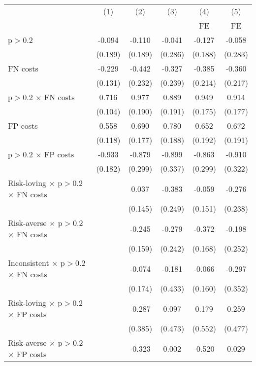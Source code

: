 \begin{tabular}{l*{5}{c}}
\hline\hline
                &\multicolumn{1}{c}{(1)}&\multicolumn{1}{c}{(2)}&\multicolumn{1}{c}{(3)}&\multicolumn{1}{c}{(4)}&\multicolumn{1}{c}{(5)}\\
                &\multicolumn{1}{c}{}&\multicolumn{1}{c}{}&\multicolumn{1}{c}{}&\multicolumn{1}{c}{FE}&\multicolumn{1}{c}{FE}\\
\hline
p$>$0.2         &   -0.094&   -0.110&   -0.041&   -0.127&   -0.058\\
                &  (0.189)&  (0.189)&  (0.286)&  (0.188)&  (0.283)\\
FN costs        &   -0.229&   -0.442&   -0.327&   -0.385&   -0.360\\
                &  (0.131)&  (0.232)&  (0.239)&  (0.214)&  (0.217)\\
p$>$0.2 $\times$ FN costs&    0.716&    0.977&    0.889&    0.949&    0.914\\
                &  (0.104)&  (0.190)&  (0.191)&  (0.175)&  (0.177)\\
FP costs        &    0.558&    0.690&    0.780&    0.652&    0.672\\
                &  (0.118)&  (0.177)&  (0.188)&  (0.192)&  (0.191)\\
p$>$0.2 $\times$ FP costs&   -0.933&   -0.879&   -0.899&   -0.863&   -0.910\\
                &  (0.182)&  (0.299)&  (0.337)&  (0.299)&  (0.322)\\
Risk-loving $\times$ p$>$0.2 $\times$ FN costs&         &    0.037&   -0.383&   -0.059&   -0.276\\
                &         &  (0.145)&  (0.249)&  (0.151)&  (0.238)\\
Risk-averse $\times$ p$>$0.2 $\times$ FN costs&         &   -0.245&   -0.279&   -0.372&   -0.198\\
                &         &  (0.159)&  (0.242)&  (0.168)&  (0.252)\\
Inconsistent $\times$ p$>$0.2 $\times$ FN costs&         &   -0.074&   -0.181&   -0.066&   -0.297\\
                &         &  (0.174)&  (0.433)&  (0.160)&  (0.352)\\
Risk-loving $\times$ p$>$0.2 $\times$ FP costs&         &   -0.287&    0.097&    0.179&    0.259\\
                &         &  (0.385)&  (0.473)&  (0.552)&  (0.477)\\
Risk-averse $\times$ p$>$0.2 $\times$ FP costs&         &   -0.323&    0.002&   -0.520&    0.029\\

\end{tabular}
